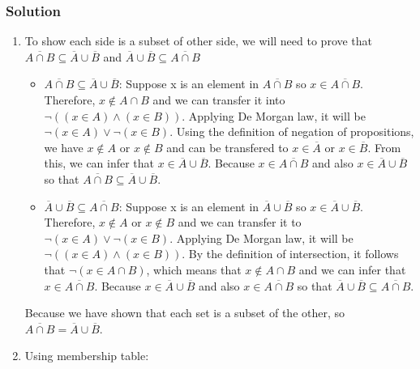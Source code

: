 \documentclass{article}
\theoremstyle{mytheoremstyle}
\theoremstyle{mytheoremstyle}
\theoremstyle{myproblemstyle}
\begin{document}
    \subsubsection*{Solution}
        \begin{enumerate} [label = (\alph*)]
            \item To show each side is a subset of other side, we will need to prove that \(\overline{A \cap B} \subseteq \overline{A} \cup \overline{B}\)
            and \(\overline{A} \cup \overline{B} \subseteq \overline{A \cap B}\)
            \begin{itemize}
                \item \(\overline{A \cap B} \subseteq \overline{A} \cup \overline{B}\): Suppose x is an element
                in \(\overline{A \cap B}\) so \(x \in \overline{A \cap B}\). Therefore, \(x \notin A \cap B\) and we can transfer
                it into \(\lnot((x \in A) \land (x \in B))\). Applying De Morgan law, it will be \(\lnot(x \in A) \lor \lnot(x \in B)\). 
                Using the definition of negation of propositions, we have \(x \notin A\) or \(x \notin B\) and can be transfered to
                \(x \in \overline{A}\) or \(x \in \overline{B}\). From this, we can infer that \(x \in \overline{A} \cup \overline{B}\).
                Because \(x \in \overline{A \cap B}\) and also \(x \in \overline{A} \cup \overline{B}\) so that \(\overline{A \cap B} \subseteq \overline{A} \cup \overline{B}\).
                \item \(\overline{A} \cup \overline{B} \subseteq \overline{A \cap B}\): Suppose x is an element 
                in \(\overline{A} \cup \overline{B}\) so \(x \in \overline{A} \cup \overline{B}\). Therefore, \(x \notin A\) or \(x \notin B\)
                and we can transfer it to \(\lnot(x\in A) \lor \lnot(x\in B)\). Applying De Morgan law, it will be \(\lnot((x \in A) \land (x \in B))\).
                By the definition of intersection, it follows that \(\lnot (x \in A \cap B)\), which means that \(x \notin A \cap B\) and
                we can infer that \(x \in \overline{A \cap B}\). Because \(x \in \overline{A} \cup \overline{B}\) and
                also \(x \in \overline{A \cap B}\) so that \(\overline{A} \cup \overline{B} \subseteq \overline{A \cap B}\).
            \end{itemize}
            Because we have shown that each set is a subset of the other, so \(\overline{A \cap B} = \overline{A} \cup \overline{B}\).
            \item Using membership table:\\

\end{enumerate}
\end{document}
